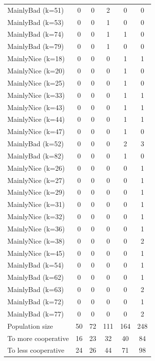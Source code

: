 \documentclass[journal,a4paper,10pt,twoside]{IEEEtran} %
\begin{document}
\begin{table}[ht]
\begin{tabular}{l|ccccc}
		MainlyBad (k=51)  &   0 &   0 &   2 &   0 &   0 \\
		MainlyBad (k=53)  &   0 &   0 &   1 &   0 &   0 \\
		MainlyBad (k=74)  &   0 &   0 &   1 &   1 &   0 \\
		MainlyBad (k=79)  &   0 &   0 &   1 &   0 &   0 \\ \midrule
		MainlyNice (k=18) &   0 &   0 &   0 &   1 &   1 \\
		MainlyNice (k=20) &   0 &   0 &   0 &   1 &   0 \\
		MainlyNice (k=25) &   0 &   0 &   0 &   1 &   0 \\
		MainlyNice (k=33) &   0 &   0 &   0 &   1 &   1 \\
		MainlyNice (k=43) &   0 &   0 &   0 &   1 &   1 \\
		MainlyNice (k=44) &   0 &   0 &   0 &   1 &   1 \\
		MainlyNice (k=47) &   0 &   0 &   0 &   1 &   0 \\
		MainlyBad (k=52)  &   0 &   0 &   0 &   2 &   3 \\
		MainlyBad (k=82)  &   0 &   0 &   0 &   1 &   0 \\ \midrule
		MainlyNice (k=26) &   0 &   0 &   0 &   0 &   1 \\
		MainlyNice (k=27) &   0 &   0 &   0 &   0 &   1 \\
		MainlyNice (k=29) &   0 &   0 &   0 &   0 &   1 \\
		MainlyNice (k=31) &   0 &   0 &   0 &   0 &   1 \\
		MainlyNice (k=32) &   0 &   0 &   0 &   0 &   1 \\
		MainlyNice (k=36) &   0 &   0 &   0 &   0 &   1 \\
		MainlyNice (k=38) &   0 &   0 &   0 &   0 &   2 \\
		MainlyNice (k=45) &   0 &   0 &   0 &   0 &   1 \\
		MainlyBad (k=54)  &   0 &   0 &   0 &   0 &   1 \\
		MainlyBad (k=62)  &   0 &   0 &   0 &   0 &   1 \\
		MainlyBad (k=63)  &   0 &   0 &   0 &   0 &   2 \\
		MainlyBad (k=72)  &   0 &   0 &   0 &   0 &   1 \\
		MainlyBad (k=77)  &   0 &   0 &   0 &   0 &   2 \\ \midrule
		Population size     &  50 &  72 & 111 & 164 & 248 \\
		To more cooperative &  16 &  23 &  32 &  40 &  84 \\
		To less cooperative &  24 &  26 &  44 &  71 &  98 \\ \bottomrule
	\end{tabular}
\end{table}
\end{document}
